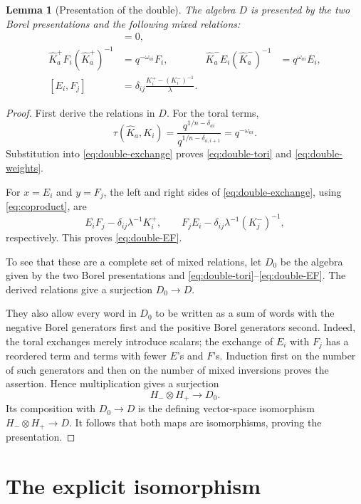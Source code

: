 \documentclass[11pt]{article}
\newtheorem{lemma}[theorem]{Lemma}
\theoremstyle{remark}
\begin{document}
\begin{lemma}[Presentation of the double]\label{lem:double}
The algebra $D$ is presented by the two Borel presentations and
the following mixed relations: 
\begin{align}
 [\widehat K_a^+,\widehat K_b^-]&=0,
 \label{eq:double-tori}\\
 \widehat K_a^+F_i(\widehat K_a^+)^{-1}
   &=q^{-\omega_{ai}}F_i,
 &
 \widehat K_a^-E_i(\widehat K_a^-)^{-1}
   &=q^{\omega_{ai}}E_i,
 \label{eq:double-weights}\\
 [E_i,F_j]
   &=\delta_{ij}\frac{K_i^+-(K_i^-)^{-1}}{\lambda}.
 \label{eq:double-EF}
\end{align}
\end{lemma}

\begin{proof}
First derive the relations in $D$.
For the toral terms,
\[
 \tau(\widehat K_a,K_i)
  =\frac{q^{1/n-\delta_{ai}}}
         {q^{1/n-\delta_{a,i+1}}}
  =q^{-\omega_{ai}}.
\]
Substitution into \eqref{eq:double-exchange} proves
\eqref{eq:double-tori} and \eqref{eq:double-weights}.

For $x=E_i$ and $y=F_j$, the left and right sides of
\eqref{eq:double-exchange}, using \eqref{eq:coproduct}, are
\[
 E_iF_j-\delta_{ij}\lambda^{-1}K_i^+,
 \qquad
 F_jE_i-\delta_{ij}\lambda^{-1}(K_j^-)^{-1},
\]
respectively.  This proves \eqref{eq:double-EF}.

To see that these are a complete set of mixed relations, let
$D_0$ be the algebra given by the two Borel presentations and
\eqref{eq:double-tori}--\eqref{eq:double-EF}.  The derived relations
give a surjection $D_0\to D$.

They also allow every word in $D_0$ to be written as a sum of
words with the negative Borel generators first and the positive
Borel generators second.  Indeed, the toral exchanges merely
introduce scalars; the exchange of $E_i$ with $F_j$ has a reordered
term and terms with fewer $E$'s and $F$'s.  Induction first on the
number of such generators and then on the number of mixed
inversions proves the assertion.  Hence multiplication gives a
surjection
\[
 H_-\otimes H_+\longrightarrow D_0.
\]
Its composition with $D_0\to D$ is the defining vector-space
isomorphism $H_-\otimes H_+\to D$.  It follows that both maps are
isomorphisms, proving the presentation.
\end{proof}

\section{The explicit isomorphism}
\end{document}
